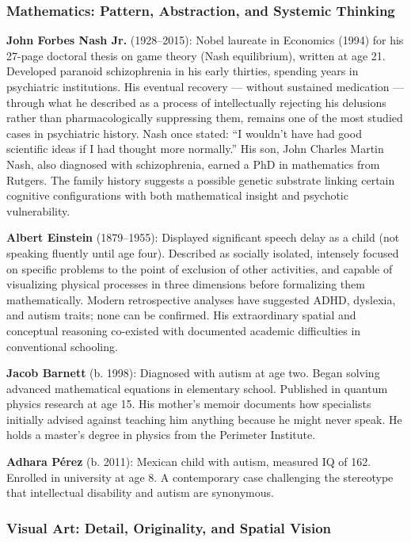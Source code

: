 \documentclass[11pt,letterpaper]{article}
\begin{document}
\subsubsection{Mathematics: Pattern, Abstraction, and Systemic Thinking}

\textbf{John Forbes Nash Jr.} (1928--2015): Nobel laureate in Economics (1994) for his 27-page doctoral thesis on game theory (Nash equilibrium), written at age 21. Developed paranoid schizophrenia in his early thirties, spending years in psychiatric institutions. His eventual recovery --- without sustained medication --- through what he described as a process of intellectually rejecting his delusions rather than pharmacologically suppressing them, remains one of the most studied cases in psychiatric history. Nash once stated: ``I wouldn't have had good scientific ideas if I had thought more normally.'' His son, John Charles Martin Nash, also diagnosed with schizophrenia, earned a PhD in mathematics from Rutgers. The family history suggests a possible genetic substrate linking certain cognitive configurations with both mathematical insight and psychotic vulnerability.

\textbf{Albert Einstein} (1879--1955): Displayed significant speech delay as a child (not speaking fluently until age four). Described as socially isolated, intensely focused on specific problems to the point of exclusion of other activities, and capable of visualizing physical processes in three dimensions before formalizing them mathematically. Modern retrospective analyses have suggested ADHD, dyslexia, and autism traits; none can be confirmed. His extraordinary spatial and conceptual reasoning co-existed with documented academic difficulties in conventional schooling.

\textbf{Jacob Barnett} (b. 1998): Diagnosed with autism at age two. Began solving advanced mathematical equations in elementary school. Published in quantum physics research at age 15. His mother's memoir documents how specialists initially advised against teaching him anything because he might never speak. He holds a master's degree in physics from the Perimeter Institute.

\textbf{Adhara Pérez} (b. 2011): Mexican child with autism, measured IQ of 162. Enrolled in university at age 8. A contemporary case challenging the stereotype that intellectual disability and autism are synonymous.

\subsubsection{Visual Art: Detail, Originality, and Spatial Vision}
\end{document}
